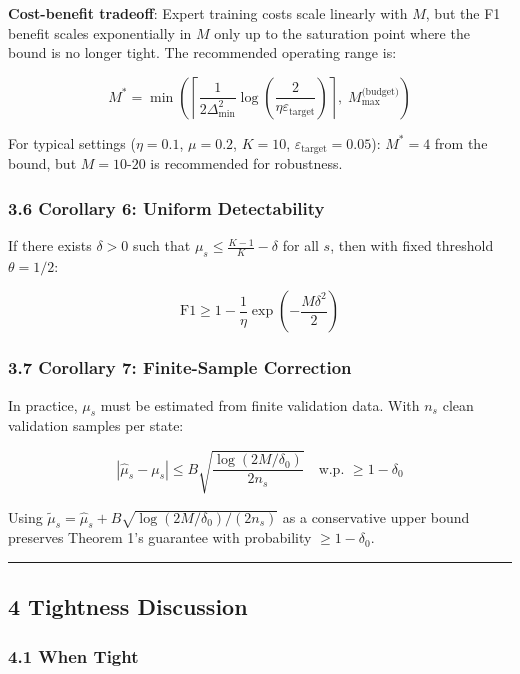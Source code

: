 \documentclass[
  12pt,
]{ctexart}
\begin{document}
\textbf{Cost-benefit tradeoff}: Expert training costs scale linearly
with \(M\), but the F1 benefit scales exponentially in \(M\) only up to
the saturation point where the bound is no longer tight. The recommended
operating range is:

\[M^* = \min\left( \left\lceil \frac{1}{2\Delta_{\min}^2} \log\left(\frac{2}{\eta \varepsilon_{\text{target}}}\right) \right\rceil,\; M_{\max}^{\text{(budget)}} \right)\]

For typical settings (\(\eta = 0.1\), \(\mu = 0.2\), \(K = 10\),
\(\varepsilon_{\text{target}} = 0.05\)): \(M^* = 4\) from the bound, but
\(M = 10\text{-}20\) is recommended for robustness.

\subsubsection{3.6 Corollary 6: Uniform
Detectability}\label{corollary-6-uniform-detectability}

If there exists \(\delta > 0\) such that
\(\mu_s \leq \frac{K-1}{K} - \delta\) for all \(s\), then with fixed
threshold \(\theta = 1/2\):

\[\text{F1} \geq 1 - \frac{1}{\eta} \exp\!\left(-\frac{M\delta^2}{2}\right)\]

\subsubsection{3.7 Corollary 7: Finite-Sample
Correction}\label{corollary-7-finite-sample-correction}

In practice, \(\mu_s\) must be estimated from finite validation data.
With \(n_s\) clean validation samples per state:

\[|\hat{\mu}_s - \mu_s| \leq B \sqrt{\frac{\log(2M/\delta_0)}{2n_s}} \quad \text{w.p. } \geq 1 - \delta_0\]

Using \(\tilde{\mu}_s = \hat{\mu}_s + B\sqrt{\log(2M/\delta_0)/(2n_s)}\)
as a conservative upper bound preserves Theorem 1's guarantee with
probability \(\geq 1 - \delta_0\).

\begin{center}\rule{0.5\linewidth}{0.5pt}\end{center}

\subsection{4 Tightness Discussion}\label{tightness-discussion}

\subsubsection{4.1 When Tight}\label{when-tight}
\end{document}
